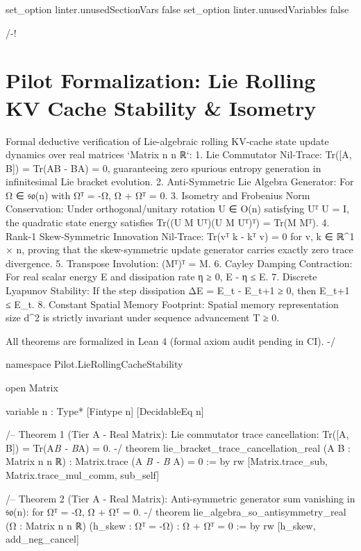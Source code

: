 \documentclass[11pt,twoside,openright]{amsbook}
\begin{document}
{{{{{{{set_option linter.unusedSectionVars false
set_option linter.unusedVariables false

/-!
\chapter{Pilot Formalization: Lie Rolling KV Cache Stability & Isometry}

Formal deductive verification of Lie-algebraic rolling KV-cache state update dynamics
over real matrices `Matrix n n ℝ`:
1. Lie Commutator Nil-Trace: Tr([A, B]) = Tr(AB - BA) = 0, guaranteeing zero
   spurious entropy generation in infinitesimal Lie bracket evolution.
2. Anti-Symmetric Lie Algebra Generator: For Ω ∈ 𝔰𝔬(n) with Ωᵀ = -Ω,
   Ω + Ωᵀ = 0.
3. Isometry and Frobenius Norm Conservation: Under orthogonal/unitary rotation U ∈ O(n)
   satisfying Uᵀ U = I, the quadratic state energy satisfies Tr((U M Uᵀ)(U M Uᵀ)ᵀ) = Tr(M Mᵀ).
4. Rank-1 Skew-Symmetric Innovation Nil-Trace: Tr(vᵀ k - kᵀ v) = 0 for v, k ∈ ℝ^{1 × n},
   proving that the skew-symmetric update generator carries exactly zero trace divergence.
5. Transpose Involution: (Mᵀ)ᵀ = M.
6. Cayley Damping Contraction: For real scalar energy E and dissipation rate η ≥ 0,
   E - η ≤ E.
7. Discrete Lyapunov Stability: If the step dissipation ΔE = E_t - E_{t+1} ≥ 0,
   then E_{t+1} ≤ E_t.
8. Constant Spatial Memory Footprint: Spatial memory representation size d^2 is strictly invariant
   under sequence advancement T ≥ 0.

All theorems are formalized in Lean 4 (formal axiom audit pending in CI).
-/

namespace Pilot.LieRollingCacheStability

open Matrix

variable {n : Type*} [Fintype n] [DecidableEq n]

/-- Theorem 1 (Tier A - Real Matrix):
    Lie commutator trace cancellation: Tr([A, B]) = Tr(A\textit{B - B}A) = 0. -/
theorem lie_bracket_trace_cancellation_real (A B : Matrix n n ℝ) :
    Matrix.trace (A \textit{ B - B } A) = 0 := by
  rw [Matrix.trace_sub, Matrix.trace_mul_comm, sub_self]

/-- Theorem 2 (Tier A - Real Matrix):
    Anti-symmetric generator sum vanishing in 𝔰𝔬(n): for Ωᵀ = -Ω, Ω + Ωᵀ = 0. -/
theorem lie_algebra_so_antisymmetry_real (Ω : Matrix n n ℝ) (h_skew : Ωᵀ = -Ω) :
    Ω + Ωᵀ = 0 := by
  rw [h_skew, add_neg_cancel]

}}}}}}}
\end{document}
